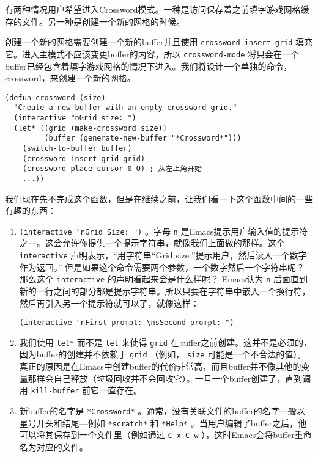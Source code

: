 有两种情况用户希望进入Crossword模式。一种是访问保存着之前填字游戏网格缓存的文件。另一种是创建一个新的网格的时候。

创建一个新的网格需要创建一个新的buffer并且使用 \texttt{crossword-insert-grid} 填充它。进入主模式不应该变更buffer的内容，所以 \texttt{crossword-mode} 将只会在一个buffer已经包含着填字游戏网格的情况下进入。我们将设计一个单独的命令，crossword，来创建一个新的网格。

\begin{verbatim}
(defun crossword (size)
  "Create a new buffer with an empty crossword grid."
  (interactive "nGrid size: ")
  (let* ((grid (make-crossword size))
         (buffer (generate-new-buffer "*Crossword*")))
    (switch-to-buffer buffer)
    (crossword-insert-grid grid)
    (crossword-place-cursor 0 O) ; 从左上角开始
    ...))
\end{verbatim}

我们现在先不完成这个函数，但是在继续之前，让我们看一下这个函数中间的一些有趣的东西：

\begin{enumerate}
  \item \texttt{(interactive "nGrid Size: ")} 。字母 \texttt{n} 是Emacs提示用户输入值的提示符之一。这会允许你提供一个提示字符串，就像我们上面做的那样。这个 \texttt{interactive} 声明表示，“用字符串“Grid size:”提示用户，然后读入一个数字作为返回。”
但是如果这个命令需要两个参数，一个数字然后一个字符串呢？那么这个 \texttt{interactive} 的声明看起来会是什么样呢？
Emacs认为 \texttt{n} 后面直到新的一行之间的部分都是提示字符串。所以只要在字符串中嵌入一个换行符，然后再引入另一个提示符就可以了，就像这样：
\begin{verbatim}
(interactive "nFirst prompt: \nsSecond prompt: ")
\end{verbatim}
  \item 我们使用 \texttt{let*} 而不是 \texttt{let} 来使得 \texttt{grid} 在buffer之前创建。这并不是必须的，因为buffer的创建并不依赖于 \texttt{grid} （例如， \texttt{size} 可能是一个不合法的值）。真正的原因是在Emacs中创建buffer的代价非常高，而且buffer并不像其他的变量那样会自己释放（垃圾回收并不会回收它）。一旦一个buffer创建了，直到调用 \texttt{kill-buffer} 前它一直存在。
  \item 新buffer的名字是 \texttt{*Crossword*} 。通常，没有关联文件的buffer的名字一般以星号开头和结尾---例如 \texttt{*scratch*} 和 \texttt{*Help*} 。当用户编辑了buffer之后，他可以将其保存到一个文件里（例如通过 \verb|C-x C-w| ），这时Emacs会将buffer重命名为对应的文件。
\end{enumerate}

